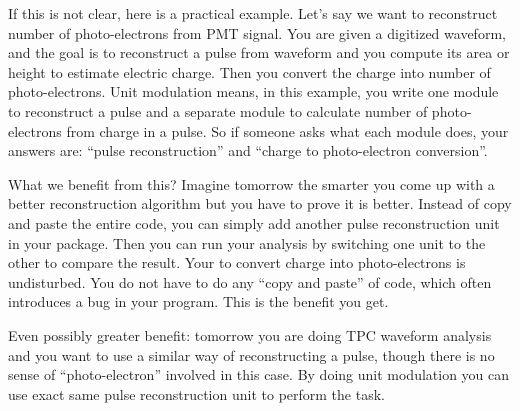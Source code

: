 If this is not clear, here is a practical example. 
Let's say we want to reconstruct number of photo-electrons from PMT signal.
You are given a digitized waveform, and the goal is to reconstruct a pulse from waveform and you compute its area or height to estimate electric charge. Then you convert the charge into number of photo-electrons.
Unit modulation means, in this example, you write one module to reconstruct a pulse and a separate module to calculate number of photo-electrons from charge in a pulse.
So if someone asks what each module does, your answers are: ``pulse reconstruction'' and ``charge to photo-electron conversion''.

What we benefit from this? Imagine tomorrow the smarter you come up with a better reconstruction algorithm but you have to prove it is better. Instead of copy and paste the entire code, you can simply add another pulse reconstruction unit in your package. Then you can run your analysis by switching one unit to the other to compare the result. Your \anaunit to convert charge into photo-electrons is undisturbed. You do not have to do any ``copy and paste'' of code, which often introduces a bug in your program. This is the benefit you get.

Even possibly greater benefit: tomorrow you are doing TPC waveform analysis and you want to use a similar way of reconstructing a pulse, though there is no sense of ``photo-electron'' involved in this case. By doing unit modulation you can use exact same pulse reconstruction unit to perform the task.















